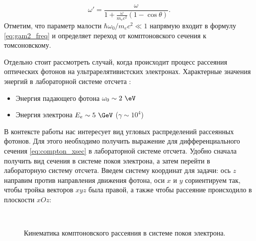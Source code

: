 \documentclass[12pt]{article}
\begin{document}
\begin{equation}
\omega' = \frac{\omega }{1+\frac{\omega}{m_e c^2}(1-\cos \theta)}.
\label{eq:gam2_freq}
\end{equation}
Отметим, что параметр малости $\hbar \omega_0 / m_e c^2 \ll 1$ напрямую входит в формулу \ref{eq:gam2_freq} и определяет переход от комптоновского сечения к томсоновскому. \par
Отдельно стоит рассмотреть случай, когда происходит процесс рассеяния оптических фотонов на ультрарелятивистских электронах. Характерные значения энергий в лабораторной системе отсчета : 
\begin{itemize}
	\item Энергия падающего фотона $\omega_0 \sim 2~\eV$
	\item Энергия электрона $E_e \sim 5~\GeV$ ($\gamma \sim 10^4$)
\end{itemize}
\par В контексте работы нас интересует вид угловых распределений рассеянных фотонов. Для этого необходимо получить выражение для дифференциального сечения \ref{eq:compton_xsec} в лабораторной системе отсчета. Удобно сначала получить вид сечения в системе покоя электрона, а затем перейти в лабораторную систему отсчета. Введем систему координат для задачи: ось $z$ направим против направления движения фотона, оси $x$ и $y$ сориентируем так, чтобы тройка векторов $xyz$ была правой, а также чтобы рассеяние происходило в плоскости $xOz$:
\begin{figure}[H]
	\\
	\caption{Кинематика комптоновского рассеяния в системе покоя электрона.}
\end{figure}
\end{document}
